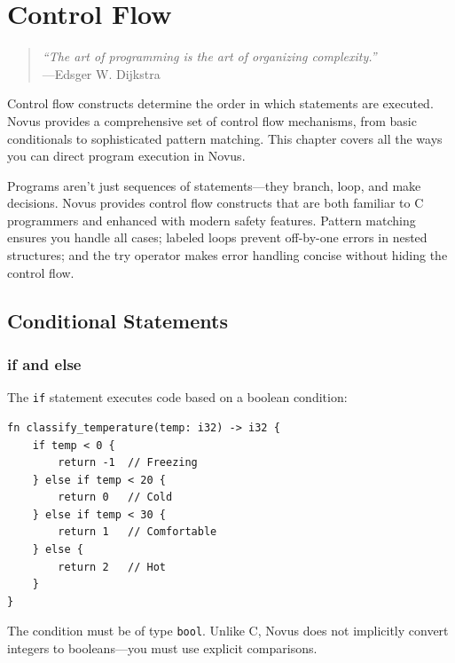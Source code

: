\chapter{Control Flow}
\label{ch:control-flow}

\begin{quote}
\textit{``The art of programming is the art of organizing complexity.''}\\
---Edsger W. Dijkstra
\end{quote}

\vspace{1em}

Control flow constructs determine the order in which statements are executed. Novus provides a comprehensive set of control flow mechanisms, from basic conditionals to sophisticated pattern matching. This chapter covers all the ways you can direct program execution in Novus.

Programs aren't just sequences of statements---they branch, loop, and make decisions. Novus provides control flow constructs that are both familiar to C programmers and enhanced with modern safety features. Pattern matching ensures you handle all cases; labeled loops prevent off-by-one errors in nested structures; and the try operator makes error handling concise without hiding the control flow.

\section{Conditional Statements}
\label{sec:conditionals}

\subsection{if and else}
\label{subsec:if-else}

The \texttt{if} statement executes code based on a boolean condition:

\begin{lstlisting}
fn classify_temperature(temp: i32) -> i32 {
    if temp < 0 {
        return -1  // Freezing
    } else if temp < 20 {
        return 0   // Cold
    } else if temp < 30 {
        return 1   // Comfortable
    } else {
        return 2   // Hot
    }
}
\end{lstlisting}

The condition must be of type \texttt{bool}. Unlike C, Novus does not implicitly convert integers to booleans---you must use explicit comparisons.

